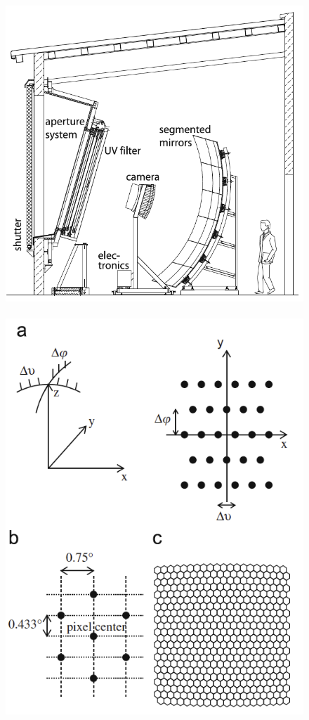 \documentclass[11pt,oneside,openany,letter]{book}
\begin{document}
\begin{figure}
    \includegraphics[scale=0.35]{figures/telescope_scheme.png} \,\,\, \includegraphics[scale=0.35]{figures/camera.png}

\end{figure}
\end{document}
